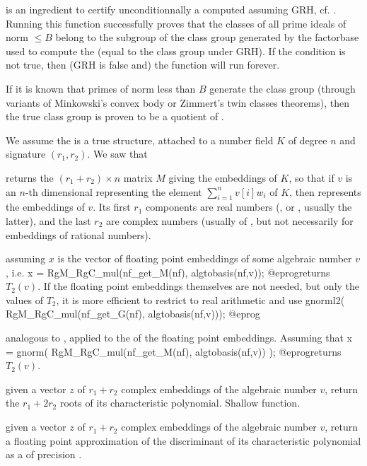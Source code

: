  is an ingredient to certify
unconditionnally a  computed assuming GRH, cf. .
Running this function successfully proves that the classes of all prime
ideals of norm $\leq B$ belong to the subgroup of the class group generated
by the factorbase used to compute the  (equal to the class group
under GRH). If the condition is not true, then (GRH is false and) the
function will run forever.

If it is known that primes of norm less than $B$ generate the class group
(through variants of Minkowski's convex body or Zimmert's twin classes
theorems), then the true class group is proven to be a quotient of
.


We assume the  is a true  structure, attached to a number
field $K$ of degree $n$ and signature $(r_1,r_2)$. We saw that

 returns the $(r_1+r_2)\times n$ matrix $M$
giving the embeddings of $K$, so that if $v$ is an $n$-th dimensional
 representing the element $\sum_{i=1}^n v[i] w_i$ of $K$, then
 represents the embeddings of $v$. Its first $r_1$
components are real numbers (,  or , usually the
latter), and the last $r_2$ are complex numbers (usually of ,
but not necessarily for embeddings of rational numbers).

 assuming $x$ is the vector of floating point
embeddings of some algebraic number $v$, i.e.
\bprog
  x = RgM_RgC_mul(nf_get_M(nf), algtobasis(nf,v));
@eprog\noindent returns $T_2(v)$. If the floating point embeddings themselves
are not needed, but only the values of $T_2$, it is more efficient to
restrict to real arithmetic and use
\bprog
  gnorml2( RgM_RgC_mul(nf_get_G(nf), algtobasis(nf,v)));
@eprog

 analogous to ,
applied to the  of the floating point embeddings. Assuming that
\bprog
  x = gnorm( RgM_RgC_mul(nf_get_M(nf), algtobasis(nf,v)) );
@eprog\noindent returns $T_2(v)$.

 given a vector $z$ of $r_1+r_2$
complex embeddings of the algebraic number $v$, return the $r_1+2r_2$ roots
of its characteristic polynomial. Shallow function.

 given a vector $z$ of
$r_1+r_2$ complex embeddings of the algebraic number $v$, return a floating
point approximation of the discriminant of its characteristic polynomial as a
 of precision .


